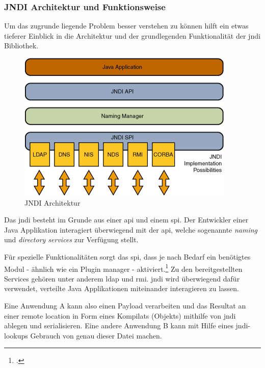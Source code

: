 \subsubsection{JNDI Architektur und Funktionsweise}

Um das zugrunde liegende Problem besser verstehen zu können hilft ein etwas tieferer Einblick in die Architektur
und der grundlegenden Funktionalität der \gls{jndi} Bibliothek.
\begin{figure}[!htb]\label{fig:jndiarch} %
    \begin{center}
        \includegraphics[scale=0.75]{images/jndiarch}
    \end{center}
    \caption{JNDI Architektur}
\end{figure}
\bigskip

Das \gls{jndi} besteht im Grunde aus einer \gls{api} und einem \gls{spi}.
Der Entwickler einer Java Applikation interagiert überwiegend mit der \gls{api}, welche sogenannte \textit{naming} und \textit{directory services} zur Verfügung stellt.

Für spezielle Funktionalitäten sorgt das \gls{spi}, dass je nach Bedarf ein benötigtes Modul - ähnlich wie ein Plugin manager - aktiviert.\footcite{JNDIArchitektur}
Zu den bereitgestellten Services gehören unter anderem \gls{ldap} und \gls{rmi}.
\gls{jndi} wird überwiegend dafür verwendet, verteilte Java Applikationen miteinander interagieren zu lassen.

Eine Anwendung A kann also einen Payload verarbeiten und das Resultat an einer remote location in Form eines Kompilats (Objekts) mithilfe von \gls{jndi} ablegen und serialisieren.
Eine andere Anwendung B kann mit Hilfe eines \gls{jndi}-lookups Gebrauch von genau dieser Datei machen.

